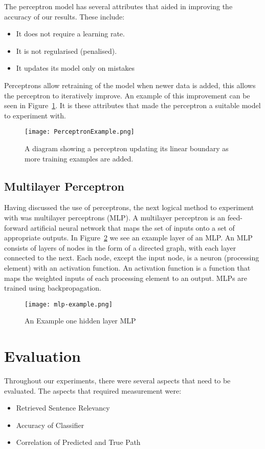 \documentclass[bsc,frontabs,twoside,singlespacing,parskip,deptreport]{infthesis}     %
\begin{document}
The perceptron model has several attributes that aided in improving the accuracy of our results.
These include:
\begin{itemize}
\item It does not require a learning rate.
\item It is not regularised (penalised).
\item It updates its model only on mistakes
\end{itemize}

Perceptrons allow retraining of the model when newer data is added, this allows the perceptron to
iteratively improve. An example of this improvement can be seen in Figure~\ref{fig:perceptronExample}.
It is these attributes that made the perceptron a suitable model to experiment with.
\begin{figure}[H]
  \centering
  \texttt{[image: PerceptronExample.png]}
  \caption{A diagram showing a perceptron updating its linear boundary as more training examples are added. }
\label{fig:perceptronExample}
\end{figure}

\subsection{Multilayer Perceptron}
Having discussed the use of perceptrons, the next logical method to experiment with was multilayer perceptrons (MLP).
A multilayer perceptron is an feed-forward artificial neural network that maps the set of inputs
onto a set of appropriate outputs.
In Figure~\ref{fig:mlp} we see an example layer of an MLP.
An MLP consists of layers of  nodes in the form of a directed graph, with each layer connected to the next.
Each node, except the input node, is a neuron (processing element) with an activation function.%
An activation function is a function that maps the weighted inputs of each processing element to an output.
MLPs are trained using backpropagation.

\begin{figure}[H]
  \centering
  \texttt{[image: mlp-example.png]}
  \caption{An Example one hidden layer MLP \cite{scikit-learn}}
  \label{fig:mlp}
\end{figure}

\section{Evaluation}
Throughout our experiments, there were several aspects that need to be evaluated.
The aspects that required measurement were:
\begin{itemize}
  \item Retrieved Sentence Relevancy
  \item Accuracy of Classifier
  \item Correlation of Predicted and True Path
\end{itemize}
\end{document}
